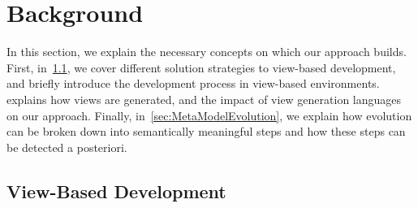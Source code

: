 \section{Background}
\label{sec:Background}


In this section, we explain the necessary concepts on which our approach builds.
First, in~\cref{sec:ViewBasedDevelopment}, we cover different solution strategies to view-based development, and briefly introduce the development process in view-based environments.
 explains how views are generated, and the impact of view generation languages on our approach.
Finally, in~\cref{sec:MetaModelEvolution}, we explain how \metamodel evolution can be broken down into semantically meaningful steps and how these steps can be detected a posteriori.


\subsection{View-Based Development}
\label{sec:ViewBasedDevelopment}


